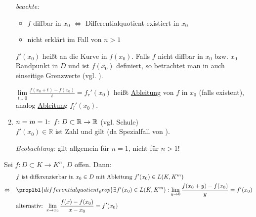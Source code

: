 \begin{enumerate}[label={\arabic*)},leftmargin=\widthof{1)\ },topsep=-5pt]
	\emph{beachte:} \begin{itemize}
		\item $f$  \gls{diffbar} in $x_0$ $\Leftrightarrow$ Differentialquotient existiert in $x_0$
		\item {} nicht erklärt im Fall von $n>1$
	\end{itemize}

	\begin{interpretation}[ für $m > 1$]
		$f'(x_0)$ heißt  an die Kurve in $f(x_0)$. Falls $f$ nicht  \gls{diffbar} in $x_0$ bzw. $x_0$ Randpunkt in $D$ und ist $f(x_0)$ definiert, so betrachtet man in  auch einseitige Grenzwerte (vgl. ).
		
		$\lim\limits_{t\downarrow 0} \frac{f(x_0 + t) - f(x_0)}{t} = f_r'(x_0)$ heißt  \uline{Ableitung} von $f$ in $x_0$ (falls existent), analog  \uline{Ableitung} $f_l'(x_0)$.
	\end{interpretation}

	\item \uline{$n=m=1\negthickspace:\;f\negthickspace: D\subset \mathbb{R}\to \mathbb{R}$} (vgl. Schule)\\[0.6ex]
	$f'(x_0)\in \mathbb{R}$ ist Zahl und  gilt (da Spezialfall von ).
	
	\emph{Beobachtung:}  gilt allgemein für $n=1$, nicht für $n>1$!
\end{enumerate}
\vspace*{1.5
	em}

\begin{conclusion}
	Sei $f:D\subset K\to K^n$, $D$ offen. Dann:
	\begin{align}
		\notag& \text{$f$ ist differenzierbar in $x_0\in D$ mit Ableitung $f'(x_0)\in L(K, K^m)$} \\
		\Leftrightarrow\quad
		& \proplbl{differentialquotient_prop} \exists f'(x_0) \in L(K, K^m): \lim\limits_{y\to 0} \frac{f(x_0 + y) - f(x_0)}{y} = f'(x_0) \\
		\notag 
		& \text{alternativ: } \lim\limits_{x\to x_0} \frac{f(x) - f(x_0)}{x - x_0} = f'(x_0)
	\end{align}
\end{conclusion}

